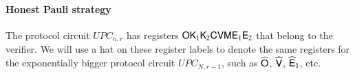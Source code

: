 





\paragraph{Honest Pauli strategy} 
The protocol circuit $UPC_{n,r}$ has registers ${\mathsf{O}} {\mathsf{K}}_1 {\mathsf{K}}_2 {\mathsf{C}} {\mathsf{V}} {\mathsf{M}} {\mathsf{E}}_1 {\mathsf{E}}_2$ that belong to the verifier. We will use a hat on these register labels to denote the same registers for the exponentially bigger protocol circuit $UPC_{N,r-1}$, such as $\widehat{{\mathsf{O}}}$, $\widehat{{\mathsf{V}}}$, $\widehat{{\mathsf{E}}}_1$, etc.

